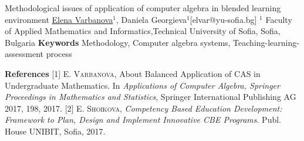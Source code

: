 \begin{abstract_online}{Methodological issues of application of computer algebra in blended learning environment}{%
        \underline{Elena Varbanova}$^{1}$, Daniela Georgieva$^{1}$}{[elvar@yu-sofia.bg]
        }{%
        $^1$ Faculty of Applied Mathematics and Informatics,Technical University of Sofia, Sofia, Bulgaria }
\textbf{Keywords} \newline{} Methodology, Computer algebra systems, Teaching-learning-assessment process

\textbf{References} \newline{}
[1] \textsc{E. Varbanova}, About Balanced Application of CAS in Undergraduate Mathematics. In \emph{Applications of Computer Algebra, Springer Proceedings in Mathematics and Statistics}, Springer International Publishing AG 2017, 198, 2017. \newline{}
[2] \textsc{E. Shoikova}, \emph{Competency Based Education Development: Framework to Plan, Design and Implement Innovative CBE Programs}. Publ. House UNIBIT, Sofia, 2017. \newline{}

\end{abstract_online}
